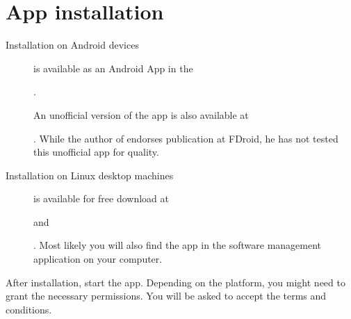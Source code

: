 \documentclass[letterpaper,10pt,english]{sphinxmanual}
\begin{document}
\section{App installation}
\label{\detokenize{01-intro/02-installation:app-installation}}\begin{description}
\item[{Installation on Android devices}] \leavevmode
\sphinxAtStartPar
{} is available as an Android App in the %
\begin{footnote}[5]\sphinxAtStartFootnote
{}
%
\end{footnote}.

\sphinxAtStartPar
An unofficial version of the app is also available at %
\begin{footnote}[6]\sphinxAtStartFootnote
{}
%
\end{footnote}.  While the
author of  endorses publication at F\sphinxhyphen{}Droid, he
has not tested this unofficial app for quality.

\item[{Installation on Linux desktop machines}] \leavevmode
\sphinxAtStartPar
{} is available for free download at %
\begin{footnote}[7]\sphinxAtStartFootnote
{}
%
\end{footnote} and
%
\begin{footnote}[8]\sphinxAtStartFootnote
{}
%
\end{footnote}.  Most likely
you will also find the app in the software management application on your
computer.

\end{description}

\sphinxAtStartPar
After installation, start the app.  Depending on the platform, you might need to
grant the necessary permissions.  You will be asked to accept the terms and
conditions.
\end{document}
